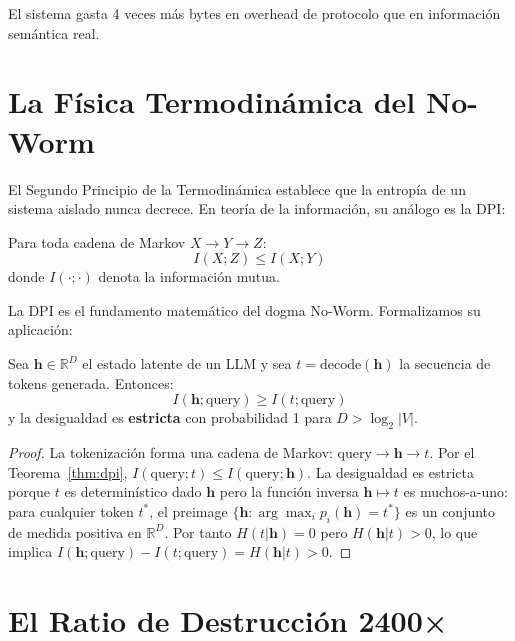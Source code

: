 El sistema gasta 4 veces más bytes en overhead de protocolo que en información
semántica real.

\section{La Física Termodinámica del No-Worm}

El Segundo Principio de la Termodinámica establece que la entropía de un sistema
aislado nunca decrece. En teoría de la información, su análogo es la DPI:

\begin{theorem}

Para toda cadena de Markov $X \to Y \to Z$:
\begin{equation}
I(X; Z) \le I(X; Y)
\end{equation}
donde $I(\cdot;\cdot)$ denota la información mutua.
\end{theorem}

La DPI es el fundamento matemático del dogma No-Worm. Formalizamos su aplicación:

\begin{proposition}

Sea $\mathbf{h} \in \mathbb{R}^D$ el estado latente de un LLM y sea $t = \text{decode}(\mathbf{h})$
la secuencia de tokens generada. Entonces:
\begin{equation}
I(\mathbf{h}; \text{query}) \ge I(t; \text{query})
\end{equation}
y la desigualdad es \textbf{estricta} con probabilidad 1 para $D > \log_2|V|$.
\end{proposition}

\begin{proof}
La tokenización forma una cadena de Markov: $\text{query} \to \mathbf{h} \to t$.
Por el Teorema~\ref{thm:dpi}, $I(\text{query}; t) \le I(\text{query}; \mathbf{h})$.
La desigualdad es estricta porque $t$ es determinístico dado $\mathbf{h}$ pero la
función inversa $\mathbf{h} \mapsto t$ es muchos-a-uno: para cualquier token $t^*$,
el preimage $\{\mathbf{h} : \arg\max_i p_i(\mathbf{h}) = t^*\}$ es un conjunto de
medida positiva en $\mathbb{R}^D$. Por tanto $H(t | \mathbf{h}) = 0$ pero $H(\mathbf{h} | t) > 0$,
lo que implica $I(\mathbf{h}; \text{query}) - I(t; \text{query}) = H(\mathbf{h} | t) > 0$.
\end{proof}

\section{El Ratio de Destrucción 2400×}

